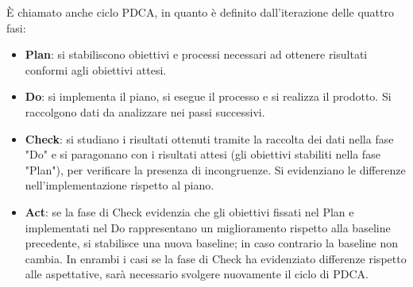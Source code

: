 È chiamato anche ciclo PDCA, in quanto è definito dall'iterazione delle quattro fasi:
 
\begin{itemize}
\item \textbf{Plan}: si stabiliscono obiettivi e processi necessari ad ottenere risultati conformi agli obiettivi attesi.
\item \textbf{Do}: si implementa il piano, si esegue il processo e si realizza il prodotto. Si raccolgono dati da analizzare nei passi successivi.
\item \textbf{Check}: si studiano i risultati ottenuti tramite la raccolta dei dati nella fase "Do" e si paragonano con i risultati attesi (gli obiettivi stabiliti nella fase "Plan"), per verificare la presenza di incongruenze. Si evidenziano le differenze nell'implementazione rispetto al piano.
\item \textbf{Act}: se la fase di Check evidenzia che gli obiettivi fissati nel Plan e implementati nel Do rappresentano un miglioramento rispetto alla baseline precedente, si stabilisce una nuova baseline; in caso contrario la baseline non cambia. In enrambi i casi se la fase di Check ha evidenziato differenze rispetto alle aspettative, sarà necessario svolgere nuovamente il ciclo di PDCA.
\end{itemize}